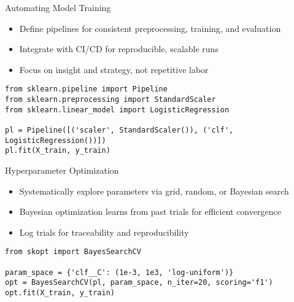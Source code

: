 \documentclass[aspectratio=169]{beamer}
\begin{document}

\begin{frame}[fragile]{Automating Model Training}
\begin{itemize}
\item Define pipelines for consistent preprocessing, training, and evaluation
\item Integrate with CI/CD for reproducible, scalable runs
\item Focus on insight and strategy, not repetitive labor
\end{itemize}

\begin{verbatim}
from sklearn.pipeline import Pipeline
from sklearn.preprocessing import StandardScaler
from sklearn.linear_model import LogisticRegression

pl = Pipeline([('scaler', StandardScaler()), ('clf', LogisticRegression())])
pl.fit(X_train, y_train)
\end{verbatim}
\end{frame}


\begin{frame}[fragile]{Hyperparameter Optimization}
\begin{itemize}
\item Systematically explore parameters via grid, random, or Bayesian search
\item Bayesian optimization learns from past trials for efficient convergence
\item Log trials for traceability and reproducibility
\end{itemize}

\begin{verbatim}
from skopt import BayesSearchCV

param_space = {'clf__C': (1e-3, 1e3, 'log-uniform')}
opt = BayesSearchCV(pl, param_space, n_iter=20, scoring='f1')
opt.fit(X_train, y_train)
\end{verbatim}
\end{frame}
\end{document}
